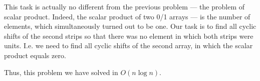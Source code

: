 This task is actually no different from the previous problem --- the problem of scalar product. Indeed, the scalar product of two 0/1 arrays --- is the number of elements, which simultaneously turned out to be one. Our task is to find all cyclic shifts of the second strips so that there was no element in which both strips were units. I.e. we need to find all cyclic shifts of the second array, in which the scalar product equals zero.

Thus, this problem we have solved in $O(n \log n)$.
